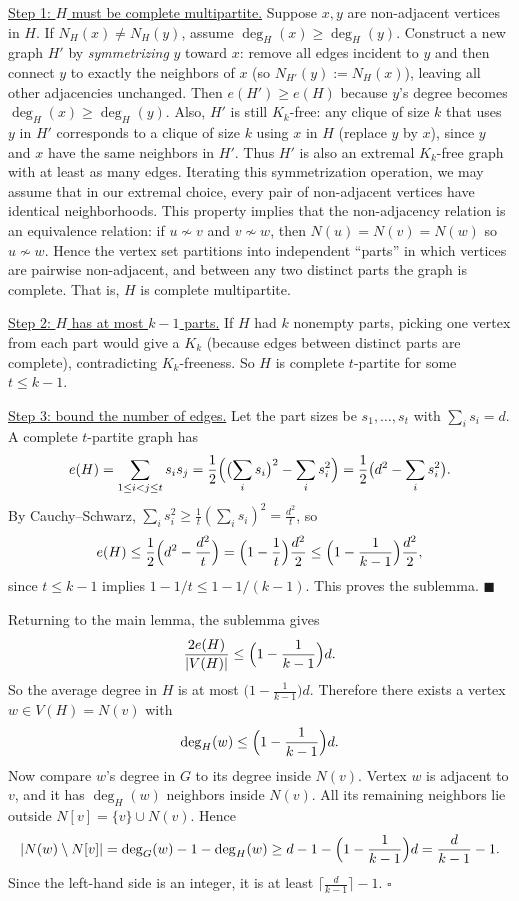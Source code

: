 \underline{Step 1: $H$ must be complete multipartite.}
Suppose $x,y$ are non-adjacent vertices in $H$.
If $N_H(x)\neq N_H(y)$, assume $\deg_H(x)\ge \deg_H(y)$.
Construct a new graph $H'$ by \emph{symmetrizing} $y$ toward $x$:
remove all edges incident to $y$ and then connect $y$ to exactly the neighbors
of $x$ (so $N_{H'}(y):=N_H(x)$), leaving all other adjacencies unchanged.
Then $e(H')\ge e(H)$ because $y$'s degree becomes $\deg_H(x)\ge \deg_H(y)$.
Also, $H'$ is still $K_k$-free: any clique of size $k$ that uses $y$ in $H'$
corresponds to a clique of size $k$ using $x$ in $H$ (replace $y$ by $x$), since
$y$ and $x$ have the same neighbors in $H'$.
Thus $H'$ is also an extremal $K_k$-free graph with at least as many edges.
Iterating this symmetrization operation, we may assume that in our extremal
choice, every pair of non-adjacent vertices have identical neighborhoods.
This property implies that the non-adjacency relation is an equivalence relation:
if $u\not\sim v$ and $v\not\sim w$, then $N(u)=N(v)=N(w)$ so $u\not\sim w$.
Hence the vertex set partitions into independent ``parts'' in which vertices are
pairwise non-adjacent, and between any two distinct parts the graph is complete.
That is, $H$ is complete multipartite.

\underline{Step 2: $H$ has at most $k-1$ parts.}
If $H$ had $k$ nonempty parts, picking one vertex from each part would give a
$K_k$ (because edges between distinct parts are complete), contradicting
$K_k$-freeness.
So $H$ is complete $t$-partite for some $t\le k-1$.

\underline{Step 3: bound the number of edges.}
Let the part sizes be $s_1,\dots,s_t$ with $\sum_i s_i=d$.
A complete $t$-partite graph has
\[
 e(H)=\sum_{1\le i<j\le t} s_i s_j = \frac{1}{2}\Bigl(\bigl(\sum_i s_i\bigr)^2 - \sum_i s_i^2\Bigr)
=\frac{1}{2}\bigl(d^2-\sum_i s_i^2\bigr).
\]
By Cauchy--Schwarz, $\sum_i s_i^2\ge \frac{1}{t}(\sum_i s_i)^2=\frac{d^2}{t}$,
so
\[
 e(H)\le \frac{1}{2}\Bigl(d^2-\frac{d^2}{t}\Bigr)=\Bigl(1-\frac{1}{t}\Bigr)\frac{d^2}{2}
\le \Bigl(1-\frac{1}{k-1}\Bigr)\frac{d^2}{2},
\]
since $t\le k-1$ implies $1-1/t\le 1-1/(k-1)$.
This proves the sublemma.
\hfill $\blacksquare$

Returning to the main lemma, the sublemma gives
\[
\frac{2e(H)}{|V(H)|} \le \Bigl(1-\frac{1}{k-1}\Bigr)d.
\]
So the average degree in $H$ is at most $\bigl(1-\frac{1}{k-1}\bigr)d$.
Therefore there exists a vertex $w\in V(H)=N(v)$ with
\[
\deg_H(w) \le \Bigl(1-\frac{1}{k-1}\Bigr)d.
\]
Now compare $w$'s degree in $G$ to its degree inside $N(v)$.
Vertex $w$ is adjacent to $v$, and it has $\deg_H(w)$ neighbors inside $N(v)$.
All its remaining neighbors lie outside $N[v]=\{v\}\cup N(v)$.
Hence
\[
|N(w)\setminus N[v]| = \deg_G(w) - 1 - \deg_H(w)
\ge d - 1 - \Bigl(1-\frac{1}{k-1}\Bigr)d
= \frac{d}{k-1}-1.
\]
Since the left-hand side is an integer, it is at least
$\lceil \frac{d}{k-1}\rceil-1$.
\hfill $\square$

